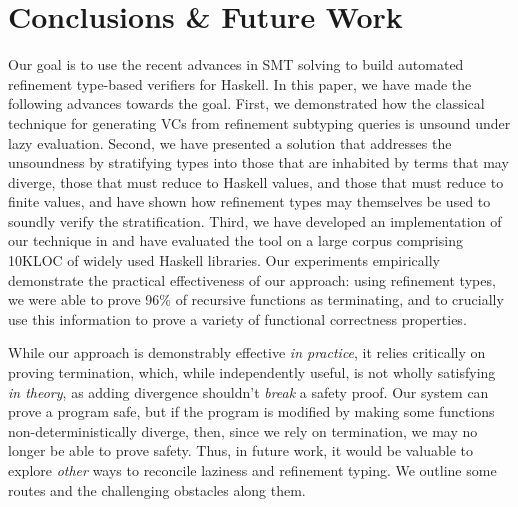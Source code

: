 \section{Conclusions \& Future Work}\label{sec:conclusion}

Our goal is to use the recent advances in SMT solving to 
build automated refinement type-based verifiers for 
Haskell.
%
In this paper, we have made the following advances 
towards the goal. 
%
First, we demonstrated how the classical technique
for generating VCs from refinement subtyping queries
is unsound under lazy evaluation.
%
Second, we have presented a solution that addresses 
the unsoundness by stratifying types into those that 
are inhabited by terms that may diverge, those that must reduce 
to Haskell values, and those that must reduce to finite values, 
and have shown how refinement types may themselves 
be used to soundly verify the stratification. 
%
Third, we have developed an implementation of our 
technique in \toolname and have evaluated the tool 
on a large corpus comprising 10KLOC of widely used 
Haskell libraries. Our experiments empirically 
demonstrate the practical effectiveness of our
approach: using refinement types, we were able 
to prove 96\% of recursive functions as 
terminating, and to crucially use this information 
to prove a variety of functional correctness properties.

While our approach is demonstrably effective 
\emph{in practice}, it relies critically on 
proving termination, which, while independently 
useful, is not wholly satisfying 
\emph{in theory}, as adding divergence shouldn't 
\emph{break} a safety proof.
%
Our system can prove a program safe, 
but if the program is modified by making 
some functions non-deterministically diverge,
then, since we rely on termination, we
may no longer be able to prove safety.
%
Thus, in future work, it would be valuable to 
explore \emph{other} ways to reconcile laziness 
and refinement typing. We outline some routes 
and the challenging obstacles along them.



